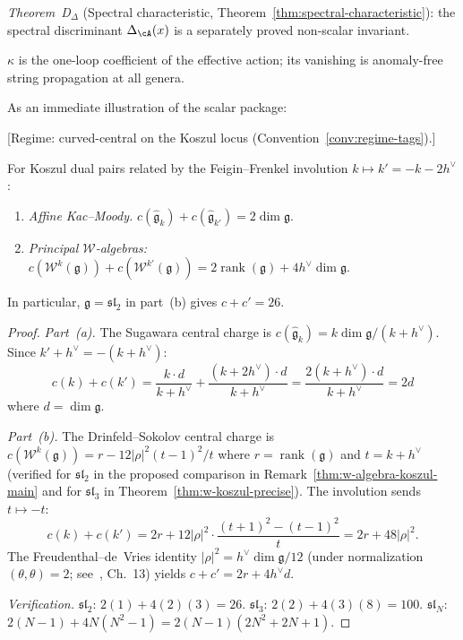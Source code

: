 \begin{itemize}
  \emph{Theorem~D$_\Delta$} (Spectral characteristic,
  Theorem~\ref{thm:spectral-characteristic}):
  the spectral discriminant $\Delta_\cA(x)$ is a separately proved
  non-scalar invariant.

  $\kappa$ is the one-loop coefficient of the effective action;
  its vanishing is anomaly-free string propagation at all genera.
\end{itemize}


As an immediate illustration of the scalar package:

\begin{theorem}\label{thm:central-charge-complementarity}
\textup{[Regime: curved-central on the Koszul locus
\textup{(}Convention~\textup{\ref{conv:regime-tags})}.]}

For Koszul dual pairs related by the Feigin--Frenkel involution
$k \mapsto k' = -k - 2h^\vee$:
\begin{enumerate}
\item[\textup{(a)}] \emph{Affine Kac--Moody.}
  $c(\widehat{\mathfrak{g}}_k) + c(\widehat{\mathfrak{g}}_{k'})
  = 2 \dim \mathfrak{g}$.
\item[\textup{(b)}] \emph{Principal $\mathcal{W}$-algebras:}
  $c(\mathcal{W}^k(\mathfrak{g})) + c(\mathcal{W}^{k'}(\mathfrak{g}))
   = 2\operatorname{rank}(\mathfrak{g}) + 4h^\vee \dim \mathfrak{g}$.
\end{enumerate}
In particular, $\mathfrak{g} = \mathfrak{sl}_2$ in
part~\textup{(b)} gives $c + c' = 26$.
\end{theorem}

\begin{proof}
\emph{Part~(a).}  The Sugawara central charge is
$c(\widehat{\mathfrak{g}}_k) = k \dim\mathfrak{g}/(k + h^\vee)$.
Since $k' + h^\vee = -(k + h^\vee)$:
\[
c(k) + c(k') = \frac{k \cdot d}{k+h^\vee}
+ \frac{(k+2h^\vee) \cdot d}{k+h^\vee}
= \frac{2(k + h^\vee) \cdot d}{k+h^\vee} = 2d
\]
where $d = \dim\mathfrak{g}$.

\emph{Part~(b).}  The Drinfeld--Sokolov central charge is
$c(\mathcal{W}^k(\mathfrak{g})) = r - 12|\rho|^2 (t-1)^2/t$
where $r = \operatorname{rank}(\mathfrak{g})$ and
$t = k + h^\vee$
(verified for $\mathfrak{sl}_2$ in
the proposed comparison in Remark~\ref{thm:w-algebra-koszul-main} and for $\mathfrak{sl}_3$
in Theorem~\ref{thm:w-koszul-precise}).
The involution sends $t \mapsto -t$:
\[
c(k) + c(k') = 2r + 12|\rho|^2 \cdot
\frac{(t+1)^2 - (t-1)^2}{t}
= 2r + 48|\rho|^2.
\]
The Freudenthal--de~Vries identity
$|\rho|^2 = h^\vee \dim\mathfrak{g}/12$
(under normalization $(\theta, \theta) = 2$;
see~\cite{Kac}, Ch.~13)
yields $c + c' = 2r + 4h^\vee d$.

\emph{Verification.}
$\mathfrak{sl}_2$: $2(1) + 4(2)(3) = 26$.
$\mathfrak{sl}_3$: $2(2) + 4(3)(8) = 100$.
$\mathfrak{sl}_N$:
$2(N{-}1) + 4N(N^2{-}1) = 2(N{-}1)(2N^2{+}2N{+}1)$.
\end{proof}

